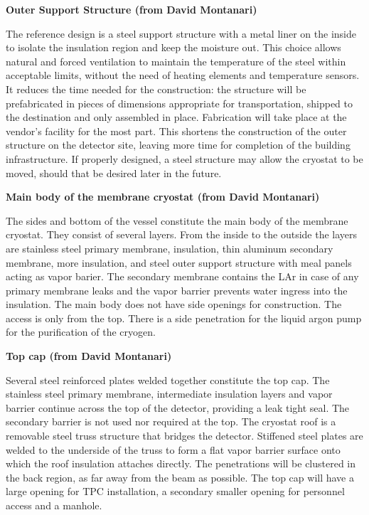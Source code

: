 \textbf{Outer Support Structure (from David Montanari)}

The reference design is a steel support structure with a metal liner on the inside to isolate the insulation region and keep the moisture out. This choice allows natural and forced ventilation to maintain the temperature of the steel within acceptable limits, without the need of heating elements and temperature sensors. It reduces the time needed for the construction: the structure will be prefabricated in pieces of dimensions appropriate for transportation, shipped to the destination and only assembled in place. Fabrication will take place at the vendor’s facility for the most part. This shortens the construction of the outer structure on the detector site, leaving more time for completion of the building infrastructure. If properly designed, a steel structure may allow the cryostat to be moved, should that be desired later in the future.

\textbf{Main body of the membrane cryostat (from David Montanari)}

The sides and bottom of the vessel constitute the main body of the membrane cryostat. They consist of several layers. From the inside to the outside the layers are stainless steel primary membrane, insulation, thin aluminum secondary membrane, more insulation, and steel outer support structure with meal panels acting as vapor barier. The secondary membrane contains the LAr in case of any primary membrane leaks and the vapor barrier prevents water ingress into the insulation. The main body does not have side openings for construction. The access is only from the top. There is a side penetration for the liquid argon pump for the purification of the cryogen.

\textbf{Top cap (from David Montanari)}

Several steel reinforced plates welded together constitute the top cap. The stainless steel primary membrane, intermediate insulation layers and vapor barrier continue across the top of the detector, providing a leak tight seal. The secondary barrier is not used nor required at the top. The cryostat roof is a removable steel truss structure that bridges the detector. Stiffened steel plates are welded to the underside of the truss to form a flat vapor barrier surface onto which the roof insulation attaches directly. The penetrations will be clustered in the back region, as far away from the beam as possible. The top cap will have a large opening for TPC installation, a secondary smaller opening for personnel access and a manhole.

